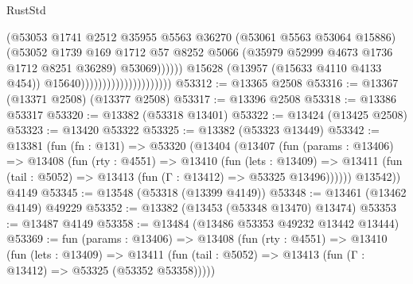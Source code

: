 \begin{lexlean}{RustStd}
\begin{coremodule}
                                                      (@53053
                                                        @1741
                                                        @2512
                                                        @35955
                                                        @5563
                                                        @36270
                                                        (@53061 @5563 @53064 @15886)
                                                        (@53052
                                                          @1739
                                                          @169
                                                          @1712
                                                          @57
                                                          @8252
                                                          @5066
                                                          (@35979
                                                            @52999
                                                            @4673
                                                            @1736
                                                            @1712
                                                            @8251
                                                            @36289)
                                                          @53069))))))
                                              @15628
                                              (@13957 (@15633 @4110 @4133 @454))
                                              @15640)))))))))))))))))))))
@53312 := @13365 @2508
@53316 := @13367 (@13371 @2508) (@13377 @2508)
@53317 := @13396 @2508
@53318 := @13386 @53317
@53320 := @13382 (@53318 @13401)
@53322 := @13424 (@13425 @2508)
@53323 := @13420 @53322
@53325 := @13382 (@53323 @13449)
@53342 := @13381
    (fun (fn : @131) =>
    @53320
      (@13404
        (@13407
          (fun (params : @13406) =>
          @13408
            (fun (rty : @4551) =>
            @13410
              (fun (lets : @13409) =>
              @13411 (fun (tail : @5052) => @13413 (fun (Γ : @13412) => @53325 @13496))))))
        @13542))
    @4149
@53345 := @13548 (@53318 (@13399 @4149))
@53348 := @13461 (@13462 @4149) @49229
@53352 := @13382 (@13453 (@53348 @13470) @13474)
@53353 := @13487 @4149
@53358 := @13484 (@13486 @53353 @49232 @13442 @13444)
@53369 := fun (params : @13406) =>
  @13408
    (fun (rty : @4551) =>
    @13410
      (fun (lets : @13409) =>
      @13411 (fun (tail : @5052) => @13413 (fun (Γ : @13412) => @53325 (@53352 @53358)))))

\end{coremodule}
\end{lexlean}
